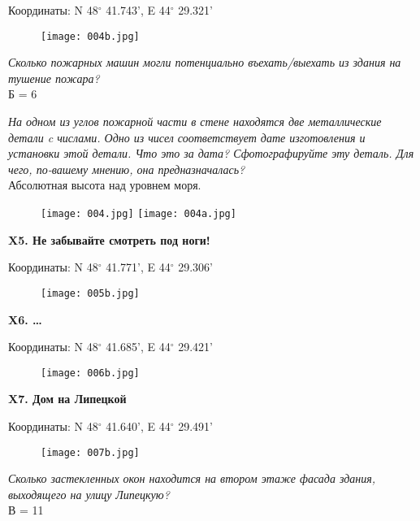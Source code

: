 \documentclass[pscyr]{hedwork}
\begin{document}
  Координаты: N 48\( ^\circ \) 41.743', E 44\( ^\circ \) 29.321'

  \begin{figure}[htbp]
    \center
    \texttt{[image: 004b.jpg]}
  \end{figure}

  \emph{Сколько пожарных машин могли потенциально въехать/выехать из здания на
  тушение пожара?} \\
  Б = 6

  \emph{На одном из углов пожарной части в стене находятся две металлические
  детали c числами. Одно из чисел соответствует дате изготовления и установки
  этой детали. Что это за дата? Сфотографируйте эту деталь. Для чего, по-вашему
  мнению, она предназначалась?} \\  
  Абсолютная высота над уровнем моря.

  \begin{figure}[htbp]
    \center
    \texttt{[image: 004.jpg]} \hfill
    \texttt{[image: 004a.jpg]}
  \end{figure}

  \pagebreak

  \textbf{X5. Не забывайте смотреть под ноги!}

  Координаты: N 48\( ^\circ \) 41.771', E 44\( ^\circ \) 29.306'

  \begin{figure}[htbp]
    \center
    \texttt{[image: 005b.jpg]}
  \end{figure}

  \pagebreak

  \textbf{X6. \ldots}

  Координаты: N 48\( ^\circ \) 41.685', E 44\( ^\circ \) 29.421'

  \begin{figure}[htbp]
    \center
    \texttt{[image: 006b.jpg]}
  \end{figure}

  \pagebreak

  \textbf{X7. Дом на Липецкой}

  Координаты: N 48\( ^\circ \) 41.640', E 44\( ^\circ \) 29.491'

  \begin{figure}[htbp]
    \center
    \texttt{[image: 007b.jpg]}
  \end{figure}

  \emph{Сколько застекленных окон находится на втором этаже фасада здания, 
  выходящего на улицу Липецкую?} \\
  В = 11
\end{document}
